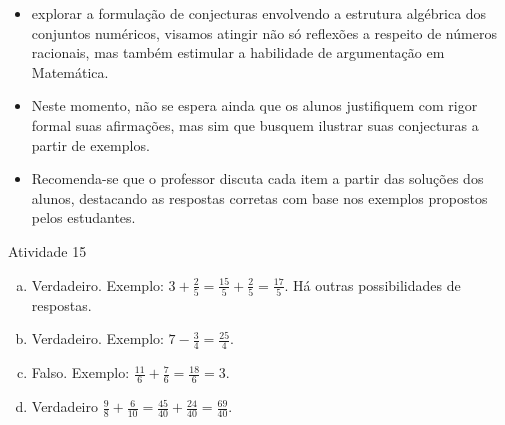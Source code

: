 \begin{multicols}{2}
  \begin{itemize} %
    \item       explorar a formulação de conjecturas envolvendo a estrutura algébrica dos conjuntos numéricos, visamos atingir não só reflexões a respeito de números racionais, mas também estimular a habilidade de argumentação em Matemática.
\end{itemize} %
  
  
   \vspace{.15cm}  

  \begin{itemize} %
    \item       Neste momento, não se espera ainda que os alunos justifiquem com rigor formal suas afirmações, mas sim que busquem ilustrar suas conjecturas a partir de exemplos.
    \item       Recomenda-se que o professor discuta cada item a partir das soluções dos alunos, destacando as respostas corretas com base nos exemplos propostos pelos estudantes.
\end{itemize} %
  

\begin{resposta*}{Atividade 15}  
  
\begin{enumerate} [a)] %
    \item       Verdadeiro. Exemplo:       $3 + \frac{2}{5} = \frac{15}{5}+\frac{2}{5} = \frac{17}{5}$.  Há outras possibilidades de respostas.
    \item       Verdadeiro. Exemplo:       $7 - \frac{3}{4} = \frac{25}{4}$.
    \item       Falso. Exemplo:       $\frac{11}{6} + \frac{7}{6} = \frac{18}{6} = 3$.
    \item       Verdadeiro       $\frac{9}{8} + \frac{6}{10} = \frac{45}{40}+ \frac{24}{40} = \frac{69}{40}$.
\end{enumerate} %
  
  
\end{resposta*}

\end{multicols}
